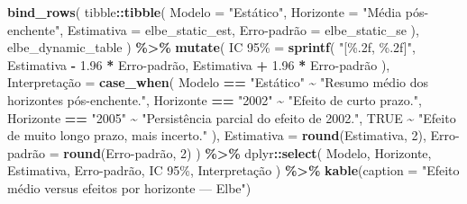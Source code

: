\documentclass[
]{article}
\newenvironment{Shaded}{\begin{snugshade}}{\end{snugshade}}
\newcommand{\AttributeTok}[1]{\textcolor[rgb]{0.13,0.29,0.53}{#1}}
\newcommand{\ConstantTok}[1]{\textcolor[rgb]{0.56,0.35,0.01}{#1}}
\newcommand{\DecValTok}[1]{\textcolor[rgb]{0.00,0.00,0.81}{#1}}
\newcommand{\FloatTok}[1]{\textcolor[rgb]{0.00,0.00,0.81}{#1}}
\newcommand{\FunctionTok}[1]{\textcolor[rgb]{0.13,0.29,0.53}{\textbf{#1}}}
\newcommand{\NormalTok}[1]{#1}
\newcommand{\OtherTok}[1]{\textcolor[rgb]{0.56,0.35,0.01}{#1}}
\newcommand{\SpecialCharTok}[1]{\textcolor[rgb]{0.81,0.36,0.00}{\textbf{#1}}}
\newcommand{\StringTok}[1]{\textcolor[rgb]{0.31,0.60,0.02}{#1}}
\begin{document}
\begin{Shaded}
\begin{Highlighting}[]
\FunctionTok{bind\_rows}\NormalTok{(}
\NormalTok{  tibble}\SpecialCharTok{::}\FunctionTok{tibble}\NormalTok{(}
    \AttributeTok{Modelo =} \StringTok{"Estático"}\NormalTok{,}
    \AttributeTok{Horizonte =} \StringTok{"Média pós{-}enchente"}\NormalTok{,}
    \AttributeTok{Estimativa =}\NormalTok{ elbe\_static\_est,}
    \StringTok{\textasciigrave{}}\AttributeTok{Erro{-}padrão}\StringTok{\textasciigrave{}} \OtherTok{=}\NormalTok{ elbe\_static\_se}
\NormalTok{  ),}
\NormalTok{  elbe\_dynamic\_table}
\NormalTok{) }\SpecialCharTok{\%\textgreater{}\%}
  \FunctionTok{mutate}\NormalTok{(}
    \StringTok{\textasciigrave{}}\AttributeTok{IC 95\%}\StringTok{\textasciigrave{}} \OtherTok{=} \FunctionTok{sprintf}\NormalTok{(}
      \StringTok{"[\%.2f, \%.2f]"}\NormalTok{,}
\NormalTok{      Estimativa }\SpecialCharTok{{-}} \FloatTok{1.96} \SpecialCharTok{*} \StringTok{\textasciigrave{}}\AttributeTok{Erro{-}padrão}\StringTok{\textasciigrave{}}\NormalTok{,}
\NormalTok{      Estimativa }\SpecialCharTok{+} \FloatTok{1.96} \SpecialCharTok{*} \StringTok{\textasciigrave{}}\AttributeTok{Erro{-}padrão}\StringTok{\textasciigrave{}}
\NormalTok{    ),}
\NormalTok{    Interpretação }\OtherTok{=} \FunctionTok{case\_when}\NormalTok{(}
\NormalTok{      Modelo }\SpecialCharTok{==} \StringTok{"Estático"} \SpecialCharTok{\textasciitilde{}} \StringTok{"Resumo médio dos horizontes pós{-}enchente."}\NormalTok{,}
\NormalTok{      Horizonte }\SpecialCharTok{==} \StringTok{"2002"} \SpecialCharTok{\textasciitilde{}} \StringTok{"Efeito de curto prazo."}\NormalTok{,}
\NormalTok{      Horizonte }\SpecialCharTok{==} \StringTok{"2005"} \SpecialCharTok{\textasciitilde{}} \StringTok{"Persistência parcial do efeito de 2002."}\NormalTok{,}
      \ConstantTok{TRUE} \SpecialCharTok{\textasciitilde{}} \StringTok{"Efeito de muito longo prazo, mais incerto."}
\NormalTok{    ),}
    \AttributeTok{Estimativa =} \FunctionTok{round}\NormalTok{(Estimativa, }\DecValTok{2}\NormalTok{),}
    \StringTok{\textasciigrave{}}\AttributeTok{Erro{-}padrão}\StringTok{\textasciigrave{}} \OtherTok{=} \FunctionTok{round}\NormalTok{(}\StringTok{\textasciigrave{}}\AttributeTok{Erro{-}padrão}\StringTok{\textasciigrave{}}\NormalTok{, }\DecValTok{2}\NormalTok{)}
\NormalTok{  ) }\SpecialCharTok{\%\textgreater{}\%}
\NormalTok{  dplyr}\SpecialCharTok{::}\FunctionTok{select}\NormalTok{(}
\NormalTok{    Modelo,}
\NormalTok{    Horizonte,}
\NormalTok{    Estimativa,}
    \StringTok{\textasciigrave{}}\AttributeTok{Erro{-}padrão}\StringTok{\textasciigrave{}}\NormalTok{,}
    \StringTok{\textasciigrave{}}\AttributeTok{IC 95\%}\StringTok{\textasciigrave{}}\NormalTok{,}
\NormalTok{    Interpretação}
\NormalTok{  ) }\SpecialCharTok{\%\textgreater{}\%}
  \FunctionTok{kable}\NormalTok{(}\AttributeTok{caption =} \StringTok{"Efeito médio versus efeitos por horizonte — Elbe"}\NormalTok{)}
\end{Highlighting}
\end{Shaded}
\end{document}
